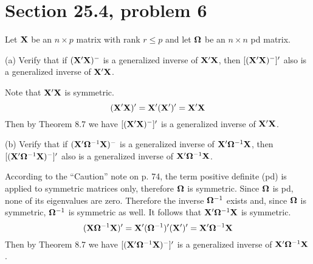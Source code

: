 \section{Section 25.4, problem 6}
Let $\bf X$ be an $n\times p$ matrix with rank $r\le p$ and let
$\bf\Omega$ be an $n\times n$ pd matrix.

\bigskip
\noindent
(a) Verify that if $({\bf X}'{\bf X})^{-{}}$ is a generalized inverse
of ${\bf X}'{\bf X}$, then $[({\bf X}'{\bf X})^{-{}}]'$ also is a
generalized inverse of ${\bf X}'{\bf X}$.

\bigskip
\noindent
Note that ${\bf X}'{\bf X}$ is symmetric.
$$({\bf X}'{\bf X})'={\bf X}'({\bf X}')'={\bf X}'{\bf X}$$
Then by Theorem 8.7 we have $[({\bf X}'{\bf X})^{-{}}]'$ is a
generalized inverse of ${\bf X}'{\bf X}$.

\bigskip
\noindent
(b) Verify that if $({\bf X}'{\bf\Omega}^{-1}{\bf X})^{-{}}$
is a generalized inverse of ${\bf X}'{\bf\Omega}^{-1}{\bf X}$,
then $[({\bf X}'{\bf\Omega}^{-1}{\bf X})^{-{}}]'$ also is a
generalized inverse of ${\bf X}'{\bf\Omega}^{-1}{\bf X}$.

\bigskip
\noindent
According to the ``Caution'' note on p. 74, the term positive
definite (pd) is applied
to symmetric matrices only, therefore $\bf\Omega$ is symmetric.
Since $\bf\Omega$ is pd, none of its eigenvalues are zero.
Therefore the inverse ${\bf\Omega}^{-1}$ exists and, since
$\bf\Omega$ is symmetric, ${\bf\Omega}^{-1}$ is symmetric as well.
It follows that ${\bf X}'{\bf\Omega}^{-1}{\bf X}$ is symmetric.
$$({\bf X}{\bf\Omega}^{-1}{\bf X})'=
{\bf X}'({\bf\Omega}^{-1})'({\bf X}')'={\bf X}'{\bf\Omega}^{-1}{\bf X}$$
Then by Theorem 8.7 we have
$[({\bf X}'{\bf\Omega}^{-1}{\bf X})^{-{}}]'$ is a
generalized inverse of ${\bf X}'{\bf\Omega}^{-1}{\bf X}$.
